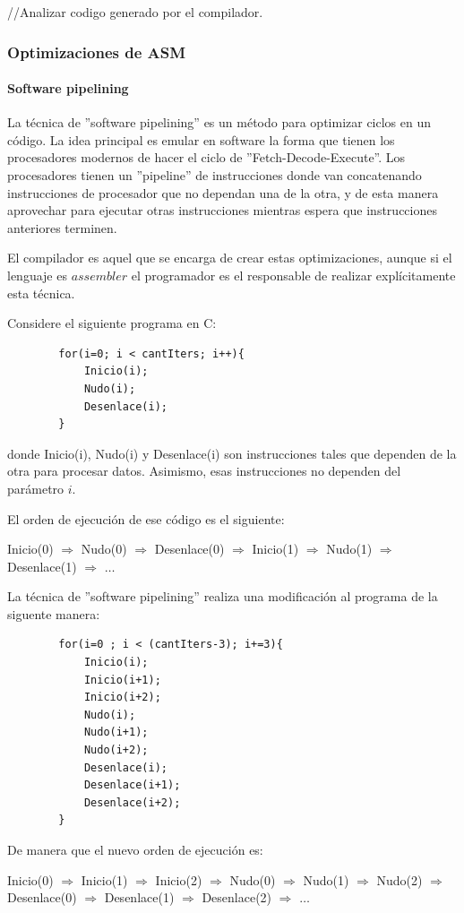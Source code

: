 		//Analizar codigo generado por el compilador.
	\subsubsection{Optimizaciones de ASM}
	
	\paragraph{Software pipelining}
		La técnica de ''software pipelining'' es un método para optimizar ciclos en un código. La idea principal es emular en software la forma que tienen los procesadores modernos de hacer el ciclo de ''Fetch-Decode-Execute''. Los procesadores tienen un ''pipeline'' de instrucciones donde van concatenando instrucciones de procesador que no dependan una de la otra, y de esta manera aprovechar para ejecutar otras instrucciones mientras espera que instrucciones anteriores terminen.

		El compilador es aquel que se encarga de crear estas optimizaciones, aunque si el lenguaje es $assembler$ el programador es el responsable de realizar explícitamente esta técnica.

		Considere el siguiente programa en C:
		\begin{verbatim}
		for(i=0; i < cantIters; i++){
		    Inicio(i);
		    Nudo(i);
		    Desenlace(i);
		}
		\end{verbatim}

		donde Inicio(i), Nudo(i) y Desenlace(i) son instrucciones tales que dependen de la otra para procesar datos. Asimismo, esas instrucciones no dependen del parámetro $i$.

		El orden de ejecución de ese código es el siguiente:

		Inicio(0) $\Rightarrow$ Nudo(0) $\Rightarrow$ Desenlace(0) $\Rightarrow$ Inicio(1) $\Rightarrow$ Nudo(1) $\Rightarrow$ Desenlace(1) $\Rightarrow$ $\ldots$ 

		La técnica de ''software pipelining'' realiza una modificación al programa de la siguente manera:
		\begin{verbatim}
		for(i=0 ; i < (cantIters-3); i+=3){
		    Inicio(i);
		    Inicio(i+1);
		    Inicio(i+2);
		    Nudo(i);
		    Nudo(i+1);
		    Nudo(i+2);
		    Desenlace(i);
		    Desenlace(i+1);
		    Desenlace(i+2);
		}
		\end{verbatim}

		De manera que el nuevo orden de ejecución es:

		Inicio(0) $\Rightarrow$ Inicio(1) $\Rightarrow$ Inicio(2) $\Rightarrow$ 
		Nudo(0) $\Rightarrow$ Nudo(1) $\Rightarrow$ Nudo(2) $\Rightarrow$ 
		Desenlace(0) $\Rightarrow$ Desenlace(1) $\Rightarrow$ Desenlace(2) $\Rightarrow$ $\ldots$ 

